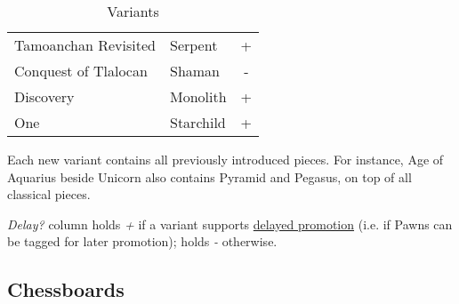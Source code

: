 \begin{table}[!h]
\begin{tabular}{ llc }
\cmidrule{1-3} %
Tamoanchan Revisited             & Serpent           & +                    \\
Conquest of Tlalocan             & Shaman            & -                    \\
Discovery                        & Monolith          & +                    \\
One                              & Starchild         & +                    \\
\bottomrule %
\end{tabular}
\caption{Variants}
\label{tbl:Appendix/Introduction/Variants}
\end{table}

Each new variant contains all previously introduced pieces. For instance, Age of
Aquarius beside Unicorn also contains Pyramid and Pegasus, on top of all classical
pieces.

\emph{Delay?} column holds \emph{+} if a variant supports
\hyperref[sec:Age of Aquarius/Promotion]{delayed promotion}
(i.e. if Pawns can be tagged for later promotion); holds \emph{-} otherwise.

\clearpage %

\subsection*{Chessboards}
\label{sec:Appendix/Introduction/Chessboards}

